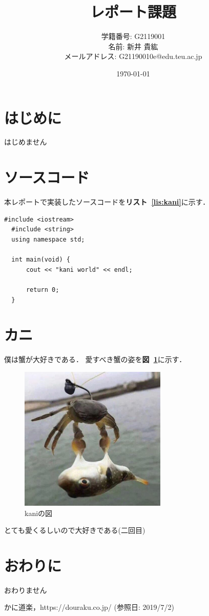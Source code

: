 \documentclass[uplatex,a4j]{jsarticle}
\newcommand\figref[1]{\textbf{図~\ref{#1}}}
\newcommand\lisref[1]{\textbf{リスト~\ref{#1}}}
\begin{document}
\title{レポート課題}
\author{学籍番号: G2119001 \\ 名前: 新井 貴紘 \\ メールアドレス: G21190010e@edu.teu.ac.jp}
\date{\today}
\maketitle

\section{はじめに}
はじめません


\section{ソースコード}
本レポートで実装したソースコードを\lisref{lis:kani}に示す．

\begin{lstlisting}[caption=outputKaniWorld.cppのソースコード,label=lis:kani]
  #include <iostream>
  #include <string>
  using namespace std;
  
  int main(void) {
      cout << "kani world" << endl;
  
      return 0;
  }
\end{lstlisting}

\section{カニ}
僕は蟹が大好きである\cite{kani}．
愛すべき蟹の姿を\figref{fig:kani}に示す．

\begin{figure}[H]
  \centering
  \includegraphics[clip,width=7.0cm]{./fig/kani.JPG}
  \caption{kaniの図}
  \label{fig:kani}
\end{figure}

とても愛くるしいので大好きである(二回目)


\section{おわりに}
おわりません



\begin{thebibliography}{9}
   かに道楽，https://douraku.co.jp/ (参照日: 2019/7/2)
\end{thebibliography}
\end{document}

